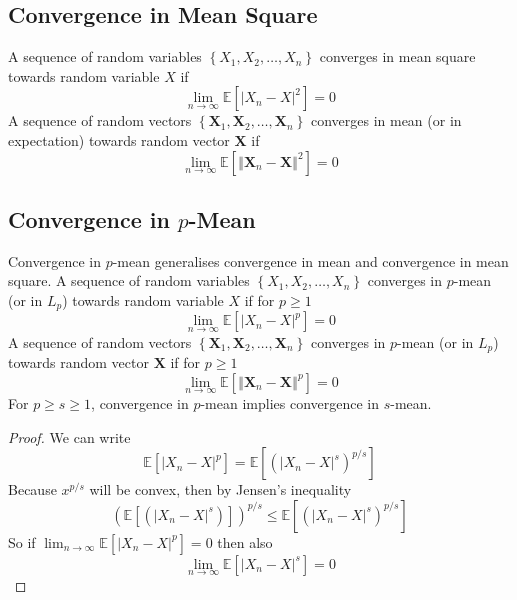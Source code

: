 \documentclass[11pt]{report} %
\begin{document}
\subsection{Convergence in Mean Square}

A sequence of random variables $\left\{X_{1}, X_{2}, \dots, X_{n} \right\}$ converges in mean square towards random variable $X$ if
\begin{equation}
\lim_{n\to\infty}\mathbb{E}\left[\left|X_{n} - X\right|^{2}\right] = 0
\end{equation}
A sequence of random vectors $\left\{\mathbf{X}_{1}, \mathbf{X}_{2}, \dots, \mathbf{X}_{n} \right\}$ converges in mean (or in expectation) towards random vector $\mathbf{X}$ if
\begin{equation}
\lim_{n\to\infty}\mathbb{E}\left[\left\Vert\mathbf{X}_{n} - \mathbf{X}\right\Vert^{2}\right] = 0
\end{equation}

\subsection{Convergence in $p$-Mean}

Convergence in $p$-mean generalises convergence in mean and convergence in mean square. A sequence of random variables $\left\{X_{1}, X_{2}, \dots, X_{n} \right\}$ converges in $p$-mean (or in $L_{p}$) towards random variable $X$ if for $p \geq 1$
\begin{equation}
\lim_{n\to\infty}\mathbb{E}\left[\left|X_{n} - X\right|^{p}\right] = 0
\end{equation}
A sequence of random vectors $\left\{\mathbf{X}_{1}, \mathbf{X}_{2}, \dots, \mathbf{X}_{n} \right\}$ converges in $p$-mean (or in $L_{p}$) towards random vector $\mathbf{X}$ if for $p \geq 1$
\begin{equation}
\lim_{n\to\infty}\mathbb{E}\left[\left\Vert\mathbf{X}_{n} - \mathbf{X}\right\Vert^{p}\right] = 0
\end{equation}
For $p \geq s \geq 1$, convergence in $p$-mean implies convergence in $s$-mean.
\begin{proof}
We can write
\begin{equation}
\mathbb{E}\left[\left|X_{n} - X\right|^{p}\right] = \mathbb{E}\left[\left(\left|X_{n} - X\right|^{s}\right)^{p/s}\right]
\end{equation}
Because $x^{p/s}$ will be convex, then by Jensen's inequality
\begin{equation}
\left(\mathbb{E}\left[\left(\left|X_{n} - X\right|^{s}\right)\right]\right)^{p/s} \leq \mathbb{E}\left[\left(\left|X_{n} - X\right|^{s}\right)^{p/s}\right]
\end{equation}
So if $\lim_{n \to \infty}\mathbb{E}\left[\left|X_{n} - X\right|^{p}\right] = 0$ then also
\begin{equation}
\lim_{n \to \infty}\mathbb{E}\left[\left|X_{n} - X\right|^{s}\right] = 0
\end{equation}
\end{proof}
\end{document}
